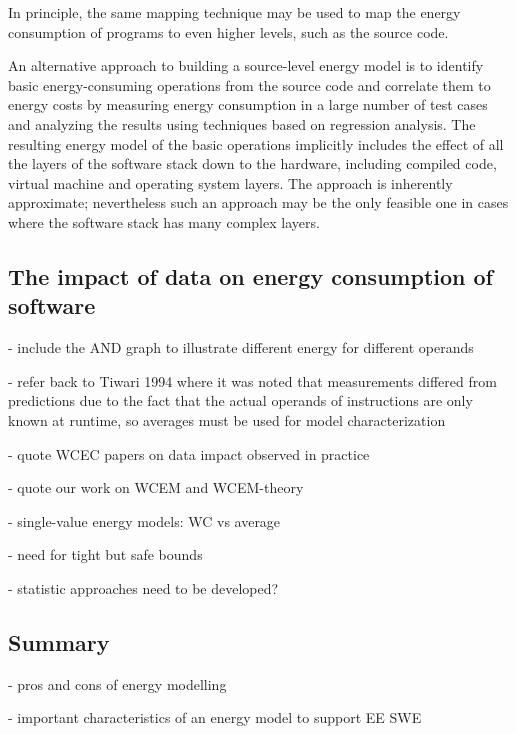 In principle, the same mapping technique may be used to map the energy consumption
of programs to even higher levels, such as the source code. 


An alternative approach to building a source-level energy model is to identify
basic energy-consuming operations from the source code and
correlate them to energy costs by measuring energy consumption in
a large number of test cases and analyzing the results using techniques
based on regression analysis. The resulting energy model of the basic
operations implicitly includes the effect of all the layers of the software
stack down to the hardware, including compiled code, virtual machine and operating
system layers. The approach is inherently approximate;
nevertheless such an approach may be the only feasible one in cases where the software
stack has many complex layers. 


\subsection{The impact of data on energy consumption of software}

- include the AND graph to illustrate different energy for different operands

- refer back to Tiwari 1994 where it was noted that measurements differed from predictions due to the fact that the actual operands of instructions are only known at runtime, so averages must be used for model characterization

- quote WCEC papers on data impact observed in practice

- quote our work on WCEM and WCEM-theory

- single-value energy models: WC vs average

- need for tight but safe bounds

- statistic approaches need to be developed?

\subsection{Summary}

- pros and cons of energy modelling

- important characteristics of an energy model to support EE SWE
